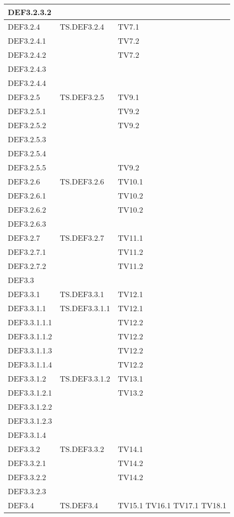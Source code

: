 \documentclass{scalatekids-article}
\begin{document}
\begin{longtable}[H]{|l|p{4cm}|p{4cm}|}
DEF3.2.3.2 & & \\
\hline
DEF3.2.4 & TS.DEF3.2.4 & TV7.1\\
\hline
DEF3.2.4.1 & & TV7.2\\
\hline
DEF3.2.4.2 & & TV7.2\\
\hline
DEF3.2.4.3 & & \\
\hline
DEF3.2.4.4 & & \\
\hline
DEF3.2.5 & TS.DEF3.2.5 & TV9.1\\
\hline
DEF3.2.5.1 & & TV9.2\\
\hline
DEF3.2.5.2 & & TV9.2\\
\hline
DEF3.2.5.3 & & \\
\hline
DEF3.2.5.4 & & \\
\hline
DEF3.2.5.5 & & TV9.2\\
\hline
DEF3.2.6 & TS.DEF3.2.6 & TV10.1\\
\hline
DEF3.2.6.1 & & TV10.2\\
\hline
DEF3.2.6.2 & & TV10.2\\
\hline
DEF3.2.6.3 & & \\
\hline
DEF3.2.7 & TS.DEF3.2.7 & TV11.1\\
\hline
DEF3.2.7.1 & & TV11.2\\
\hline
DEF3.2.7.2 & & TV11.2\\
\hline
DEF3.3 & & \\
\hline
DEF3.3.1 & TS.DEF3.3.1 & TV12.1\\
\hline
DEF3.3.1.1 & TS.DEF3.3.1.1 & TV12.1\\
\hline
DEF3.3.1.1.1 & & TV12.2\\
\hline
DEF3.3.1.1.2 & & TV12.2\\
\hline
DEF3.3.1.1.3 & & TV12.2\\
\hline
DEF3.3.1.1.4 & & TV12.2\\
\hline
DEF3.3.1.2 & TS.DEF3.3.1.2 & TV13.1\\
\hline
DEF3.3.1.2.1 & & TV13.2\\
\hline
DEF3.3.1.2.2 & & \\
\hline
DEF3.3.1.2.3 & & \\
\hline
DEF3.3.1.4 & & \\
\hline
DEF3.3.2 & TS.DEF3.3.2 & TV14.1\\
\hline
DEF3.3.2.1 & & TV14.2\\
\hline
DEF3.3.2.2 & & TV14.2\\
\hline
DEF3.3.2.3 & & \\ %
\hline
DEF3.4 & TS.DEF3.4 & TV15.1 TV16.1 TV17.1 TV18.1\\

\end{longtable}
\end{document}
